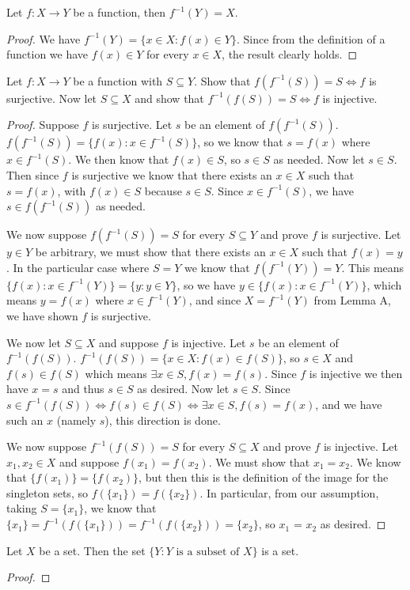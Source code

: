 \documentclass[12pt]{article}
\newenvironment{lemma}[2][Lemma]{\begin{trivlist}
\item[\hskip \labelsep {\bfseries #1}\hskip \labelsep {\bfseries #2}]}{\end{trivlist}}
\newenvironment{exercise}[2][Exercise]{\begin{trivlist}
\item[\hskip \labelsep {\bfseries #1}\hskip \labelsep {\bfseries #2}]}{\end{trivlist}}
\begin{document}
\begin{lemma}{A}
	Let $ f : X \to Y $ be a function, then $ f^{-1}(Y) = X $.
\end{lemma}
\begin{proof}
	We have $ f^{-1}(Y) = \{ x \in X : f(x) \in Y \} $.
	Since from the definition of a function we have $ f(x) \in Y $ for every $ x \in X $, the result clearly holds.
\end{proof}

\begin{exercise}{3.4.5}
	Let $ f : X \to Y $ be a function with $ S \subseteq Y $.
	Show that $ f(f^{-1}(S)) = S \iff f $ is surjective.
	Now let $ S \subseteq X $ and show that $ f^{-1}(f(S)) = S \iff f $ is injective.
\end{exercise}
\begin{proof}
	Suppose $ f $ is surjective.
	Let $ s $ be an element of $ f(f^{-1}(S)) $.
	$ f(f^{-1}(S)) = \{ f(x) : x \in f^{-1}(S) \} $, so we know that $ s = f(x) $ where $ x \in f^{-1}(S) $.
	We then know that $ f(x) \in S $, so $ s \in S $ as needed.
	Now let $ s \in S $.
	Then since $ f $ is surjective we know that there exists an $ x \in X $ such that $ s = f(x) $, with $ f(x) \in S $ because $ s \in S $.
	Since $ x \in f^{-1}(S) $, we have $ s \in f(f^{-1}(S)) $ as needed.
	
	We now suppose $ f(f^{-1}(S)) = S $ for every $ S \subseteq Y $ and prove $ f $ is surjective.
	Let $ y \in Y $ be arbitrary, we must show that there exists an $ x \in X $ such that $ f(x) = y $.
	In the particular case where $ S = Y $ we know that $ f(f^{-1}(Y)) = Y $.
	This means $ \{ f(x) : x \in f^{-1}(Y) \} = \{ y : y \in Y \} $, so we have $ y \in \{ f(x) : x \in f^{-1}(Y) \} $, which means $ y = f(x) $ where $ x \in f^{-1}(Y) $, and since $ X = f^{-1}(Y) $ from Lemma A, we have shown $ f $ is surjective.
	
	We now let $ S \subseteq X $ and suppose $ f $ is injective.
	Let $ s $ be an element of $ f^{-1}(f(S)) $.
	$ f^{-1}(f(S)) = \{ x \in X : f(x) \in f(S) \} $, so $ s \in X $ and $ f(s) \in f(S) $ which means $ \exists x \in S, f(x) = f(s) $.
	Since $ f $ is injective we then have $ x = s $ and thus $ s \in S $ as desired.
	Now let $ s \in S $.
	Since $ s \in f^{-1}(f(S)) \iff f(s) \in f(S) \iff \exists x \in S, f(s) = f(x) $, and we have such an $ x $ (namely $ s $), this direction is done.
	
	We now suppose $ f^{-1}(f(S)) = S $ for every $ S \subseteq X $ and prove $ f $ is injective.
	Let $ x_{1}, x_{2} \in X $ and suppose $ f(x_{1}) = f(x_{2}) $.
	We must show that $ x_{1} = x_{2} $.
	We know that $ \{ f(x_{1}) \} = \{ f(x_{2}) \} $, but then this is the definition of the image for the singleton sets, so $ f(\{ x_{1} \}) = f(\{ x_{2} \}) $.
	In particular, from our assumption, taking $ S = \{ x_{1} \} $, we know that $ \{ x_{1} \} = f^{-1}(f(\{ x_{1} \})) = f^{-1}(f(\{ x_{2} \})) = \{ x_{2} \} $, so $ x_{1} $ = $ x_{2} $ as desired.
\end{proof}

\begin{lemma}{3.4.9}
	Let $ X $ be a set.
	Then the set $ \{ Y : Y \text{ is a subset of } X \} $ is a set.
\end{lemma}
\begin{proof}
	
\end{proof}
\end{document}

